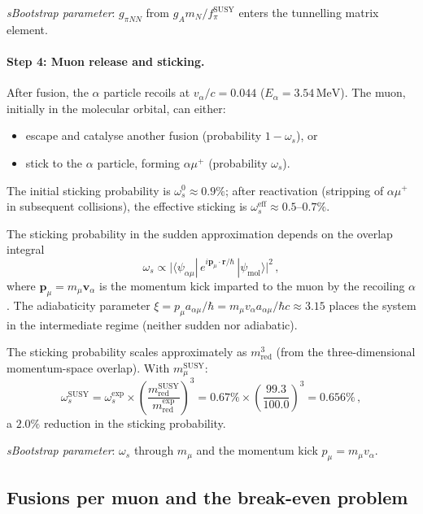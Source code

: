 \documentclass[12pt,a4paper]{article}
\newcommand{\MeV}{\,\text{MeV}}
\newcommand{\fpi}{f_\pi}
\begin{document}
\emph{sBootstrap parameter}: $g_{\pi NN}$ from
$g_A m_N / \fpi^{\text{SUSY}}$ enters the tunnelling matrix element.

\paragraph{Step 4: Muon release and sticking.}
After fusion, the $\alpha$ particle recoils at
$v_\alpha/c = 0.044$ ($E_\alpha = 3.54\MeV$).
The muon, initially in the molecular orbital, can either:
\begin{itemize}
\item[(a)] escape and catalyse another fusion (probability $1-\omega_s$), or
\item[(b)] stick to the $\alpha$ particle, forming $\alpha\mu^+$
  (probability $\omega_s$).
\end{itemize}
The initial sticking probability is $\omega_s^0 \approx 0.9\%$;
after reactivation (stripping of $\alpha\mu^+$ in subsequent collisions),
the effective sticking is $\omega_s^{\text{eff}} \approx 0.5$--$0.7\%$.

The sticking probability in the sudden approximation depends on the
overlap integral
\begin{equation}
  \omega_s \propto
  \bigl|\langle\psi_{\alpha\mu}|\,e^{i\mathbf{p}_\mu\cdot\mathbf{r}/\hbar}\,
  |\psi_{\text{mol}}\rangle\bigr|^2\,,
\end{equation}
where $\mathbf{p}_\mu = m_\mu \mathbf{v}_\alpha$ is the momentum
kick imparted to the muon by the recoiling $\alpha$.  The
adiabaticity parameter
$\xi = p_\mu a_{\alpha\mu} / \hbar
= m_\mu v_\alpha a_{\alpha\mu} / \hbar c
\approx 3.15$ places the system in the intermediate regime
(neither sudden nor adiabatic).

The sticking probability scales approximately as $m_{\text{red}}^3$
(from the three-dimensional momentum-space overlap).  With
$m_\mu^{\text{SUSY}}$:
\begin{equation}
  \omega_s^{\text{SUSY}}
  = \omega_s^{\text{exp}} \times
    \left(\frac{m_{\text{red}}^{\text{SUSY}}}{m_{\text{red}}^{\text{exp}}}\right)^3
  = 0.67\% \times \left(\frac{99.3}{100.0}\right)^3
  = 0.656\%\,,
\end{equation}
a $2.0\%$ reduction in the sticking probability.

\emph{sBootstrap parameter}: $\omega_s$ through $m_\mu$ and the
momentum kick $p_\mu = m_\mu v_\alpha$.

\subsection{Fusions per muon and the break-even problem}
\end{document}
